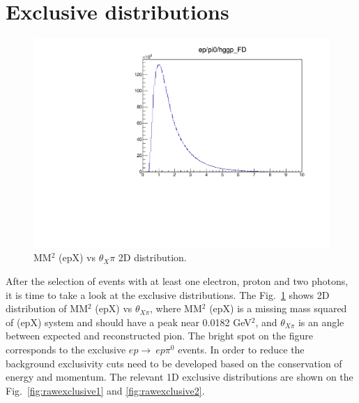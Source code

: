 \section{Exclusive distributions}\label{sec:eventselection}



\iffalse
\begin{figure}
	\vspace*{-0.3cm}
	\includegraphics[page=10,width=0.97\linewidth]{figures/eppi0.exclusive.pdf}
	\caption{MM$^2$ (epX) vs $\theta_X\pi$ 2D distribution.}
	\label{fig:MM2vsThetaXPi}
\end{figure}
After the selection of events with at least one electron, proton and two photons, it is time to take a look at the exclusive distributions.
The Fig.~\ref{fig:MM2vsThetaXPi} shows 2D distribution of MM$^2$ (epX) vs $\theta_{X\pi}$, where MM$^2$ (epX) is a missing mass squared of (epX) system and should have a peak near 0.0182 GeV$^2$, and $\theta_{X\pi}$ is an angle between expected and reconstructed pion.
The bright spot on the figure corresponds to the exclusive $ep\rightarrow~ep\pi^0$ events.
In order to reduce the background exclusivity cuts  need to be developed based on the conservation of energy and momentum.
The relevant 1D exclusive distributions are shown on the Fig.~\ref{fig:rawexclusive1} and \ref{fig:rawexclusive2}.

